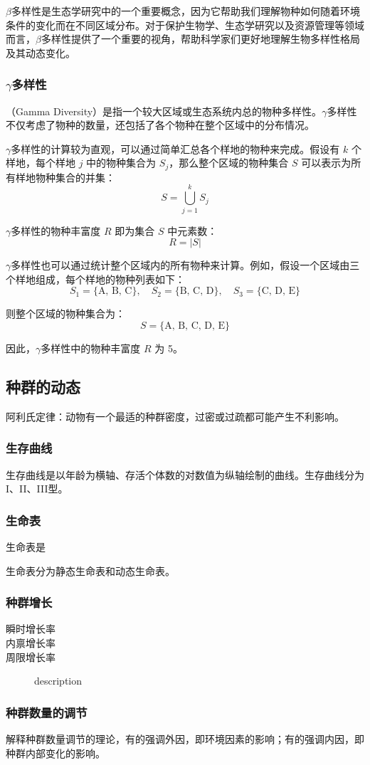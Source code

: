 $\beta$多样性是生态学研究中的一个重要概念，因为它帮助我们理解物种如何随着环境条件的变化而在不同区域分布。对于保护生物学、生态学研究以及资源管理等领域而言，$\beta$多样性提供了一个重要的视角，帮助科学家们更好地理解生物多样性格局及其动态变化。

\subsubsection{$\gamma$多样性}

（Gamma Diversity）是指一个较大区域或生态系统内总的物种多样性。$\gamma$多样性不仅考虑了物种的数量，还包括了各个物种在整个区域中的分布情况。

$\gamma$多样性的计算较为直观，可以通过简单汇总各个样地的物种来完成。假设有 \( k \) 个样地，每个样地 \( j \) 中的物种集合为 \( S_j \)，那么整个区域的物种集合 \( S \) 可以表示为所有样地物种集合的并集：
\[
S = \bigcup_{j=1}^{k} S_j
\]

$\gamma$多样性的物种丰富度 \( R \) 即为集合 \( S \) 中元素数：
\[
R = |S|
\]

$\gamma$多样性也可以通过统计整个区域内的所有物种来计算。例如，假设一个区域由三个样地组成，每个样地的物种列表如下：
\[
S_1 = \{\textrm{A, B, C}\}, \quad S_2 = \{\textrm{B, C, D}\}, \quad S_3 = \{\textrm{C, D, E}\}
\]

则整个区域的物种集合为：
\[
S = \{\textrm{A, B, C, D, E}\}
\]

因此，$\gamma$多样性中的物种丰富度 \( R \) 为 5。

\subsection{种群的动态}

阿利氏定律：动物有一个最适的种群密度，过密或过疏都可能产生不利影响。

\subsubsection{生存曲线}

生存曲线是以年龄为横轴、存活个体数的对数值为纵轴绘制的曲线。生存曲线分为I、II、III型。

\subsubsection{生命表}

生命表是

生命表分为静态生命表和动态生命表。

\subsubsection{种群增长}

\begin{description}
	\item[瞬时增长率]
	\item[内禀增长率]
	\item[周限增长率] description
\end{description}

\subsubsection{种群数量的调节}

解释种群数量调节的理论，有的强调外因，即环境因素的影响；有的强调内因，即种群内部变化的影响。

